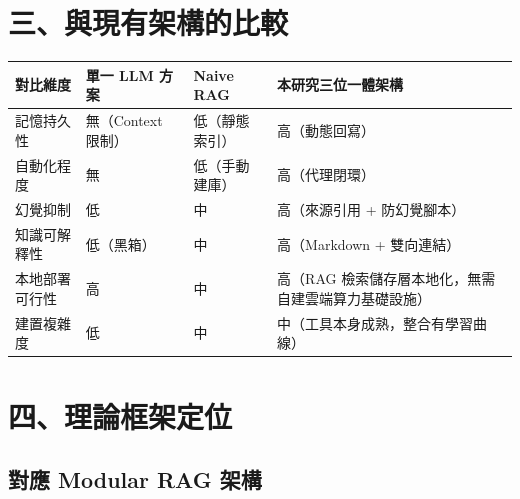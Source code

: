 \section{三、與現有架構的比較}\label{ux4e09ux8207ux73feux6709ux67b6ux69cbux7684ux6bd4ux8f03}

{\def\LTcaptype{none} %
\begin{longtable}[]{@{}
  >{\raggedright\arraybackslash}p{}
  >{\raggedright\arraybackslash}p{}
  >{\raggedright\arraybackslash}p{}
  >{\raggedright\arraybackslash}p{}@{}}
\toprule\noalign{}
\begin{minipage}[b]{\linewidth}\raggedright
對比維度
\end{minipage} & \begin{minipage}[b]{\linewidth}\raggedright
單一 LLM 方案
\end{minipage} & \begin{minipage}[b]{\linewidth}\raggedright
Naive RAG
\end{minipage} & \begin{minipage}[b]{\linewidth}\raggedright
本研究三位一體架構
\end{minipage} \\
\midrule\noalign{}
\endhead
\bottomrule\noalign{}
\endlastfoot
記憶持久性 & 無（Context 限制） & 低（靜態索引） & 高（動態回寫） \\
自動化程度 & 無 & 低（手動建庫） & 高（代理閉環） \\
幻覺抑制 & 低 & 中 & 高（來源引用 + 防幻覺腳本） \\
知識可解釋性 & 低（黑箱） & 中 & 高（Markdown + 雙向連結） \\
本地部署可行性 & 高 & 中 & 高（RAG
檢索儲存層本地化，無需自建雲端算力基礎設施） \\
建置複雜度 & 低 & 中 & 中（工具本身成熟，整合有學習曲線） \\
\end{longtable}
}

\section{四、理論框架定位}\label{ux56dbux7406ux8ad6ux6846ux67b6ux5b9aux4f4d}

\subsection{對應 Modular RAG
架構}\label{ux5c0dux61c9-modular-rag-ux67b6ux69cb}

